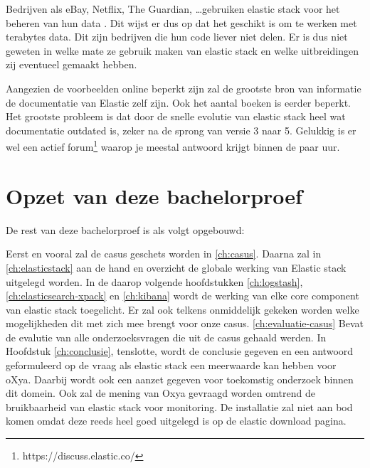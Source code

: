 Bedrijven als eBay, Netflix, The Guardian, \dots gebruiken elastic stack voor het beheren van hun data \autocite{15companies}. Dit wijst er dus op dat het geschikt is om te werken met terabytes data. Dit zijn bedrijven die hun code liever niet delen. Er is dus niet geweten in welke mate ze gebruik maken van elastic stack en welke uitbreidingen zij eventueel gemaakt hebben.

Aangezien de voorbeelden online beperkt zijn zal de grootste bron van informatie de documentatie van Elastic zelf zijn. Ook het aantal boeken is eerder beperkt. Het grootste probleem is dat door de snelle evolutie van elastic stack heel wat documentatie outdated is, zeker na de sprong van versie 3 naar 5. Gelukkig is er wel een actief forum\footnote{https://discuss.elastic.co/} waarop je meestal antwoord krijgt binnen de paar uur.

\section{Opzet van deze bachelorproef}
\label{sec:opzet-bachelorproef}

De rest van deze bachelorproef is als volgt opgebouwd:

Eerst en vooral zal de casus geschets worden in \ref{ch:casus}. Daarna zal in \ref{ch:elasticstack} aan  de hand en overzicht de globale werking van Elastic stack uitgelegd worden. 
In de daarop volgende hoofdstukken \ref{ch:logstash},\ref{ch:elasticsearch-xpack} en \ref{ch:kibana} wordt de werking van elke core component van elastic stack toegelicht. Er zal ook telkens onmiddelijk gekeken worden welke mogelijkheden dit met zich mee brengt voor onze casus. 
\ref{ch:evaluatie-casus} Bevat de evalutie van alle onderzoeksvragen die uit de casus gehaald werden.
In Hoofdstuk \ref{ch:conclusie}, tenslotte, wordt de conclusie gegeven en een antwoord geformuleerd op de vraag als elastic stack een meerwaarde kan hebben voor oXya. Daarbij wordt ook een aanzet gegeven voor toekomstig onderzoek binnen dit domein. Ook zal de mening van Oxya gevraagd worden omtrend de bruikbaarheid van elastic stack voor monitoring. 
De installatie zal niet aan bod komen omdat deze reeds heel goed uitgelegd is op de elastic download pagina.
